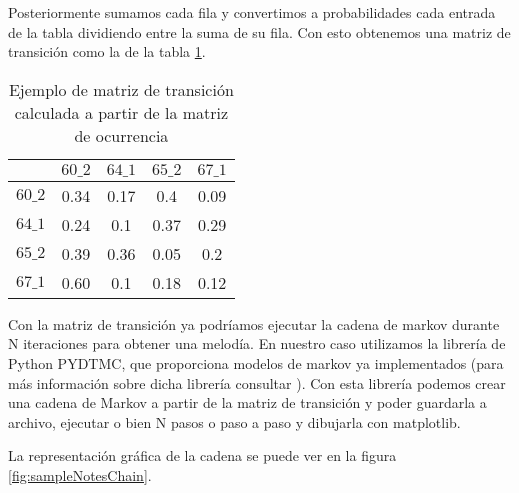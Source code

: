     Posteriormente sumamos cada fila y convertimos a probabilidades cada entrada de la tabla dividiendo entre la suma de su fila. Con esto obtenemos una matriz de transición como la de la tabla \ref{tab:sampleTransitionMatrix}.

    \begin{table}
	\centering
	\begin{tabular}{c|c|c|c|c}
		\textbf{} & \textbf{$60\_2$} & \textbf{$64\_1$} &         
            \textbf{$65\_2$} &     \textbf{$67\_1$}\\
		\hline
		\textbf{$60\_2$} & 0.34 & 0.17 & 0.4 & 0.09\\
		\hline
		\textbf{$64\_1$} & 0.24 & 0.1 & 0.37 & 0.29\\
		\hline
		\textbf{$65\_2$} & 0.39 & 0.36 & 0.05 & 0.2\\
		\hline
		\textbf{$67\_1$} & 0.60 & 0.1 & 0.18 & 0.12\\
	\end{tabular}
	\caption{Ejemplo de matriz de transición calculada a partir de la matriz de ocurrencia}
	\label{tab:sampleTransitionMatrix}
    \end{table}

    Con la matriz de transición ya podríamos ejecutar la cadena de markov durante N iteraciones para obtener una melodía. En nuestro caso utilizamos la librería de Python PYDTMC, que proporciona modelos de markov ya implementados (para más información sobre dicha librería consultar \cite{PYDTMC}). Con esta librería podemos crear una cadena de Markov a partir de la matriz de transición y poder guardarla a archivo, ejecutar o bien N pasos o paso a paso y dibujarla con matplotlib.
    
    La representación gráfica de la cadena se puede ver en la figura \ref{fig:sampleNotesChain}.

